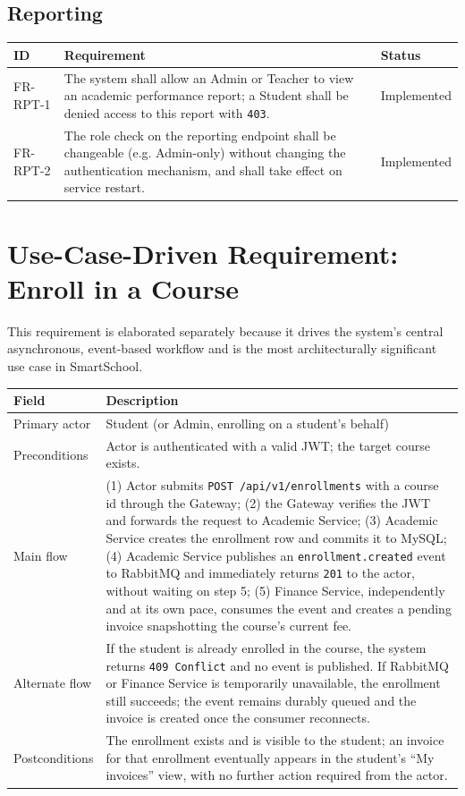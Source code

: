 \documentclass[11pt,a4paper]{report}
\newcommand{\sysname}{SmartSchool}
\begin{document}
\subsection{Reporting}
\begin{longtable}{p{1.9cm} L{10.3cm} p{2.1cm}}
\toprule
\textbf{ID} & \textbf{Requirement} & \textbf{Status} \\
\midrule
\endhead
FR-RPT-1 & The system shall allow an Admin or Teacher to view an academic performance report; a Student shall be denied access to this report with \texttt{403}. & Implemented \\
FR-RPT-2 & The role check on the reporting endpoint shall be changeable (e.g. Admin-only) without changing the authentication mechanism, and shall take effect on service restart. & Implemented \\
\bottomrule
\end{longtable}

\section{Use-Case-Driven Requirement: Enroll in a Course}
This requirement is elaborated separately because it drives the system's
central asynchronous, event-based workflow and is the most architecturally
significant use case in \sysname{}.

\begin{longtable}{L{3.3cm} L{10.7cm}}
\toprule
\textbf{Field} & \textbf{Description} \\
\midrule
\endhead
Primary actor & Student (or Admin, enrolling on a student's behalf) \\
Preconditions & Actor is authenticated with a valid JWT; the target course exists. \\
Main flow & (1) Actor submits \texttt{POST /api/v1/enrollments} with a course id through the Gateway; (2) the Gateway verifies the JWT and forwards the request to Academic Service; (3) Academic Service creates the enrollment row and commits it to MySQL; (4) Academic Service publishes an \texttt{enrollment.created} event to RabbitMQ and immediately returns \texttt{201} to the actor, without waiting on step 5; (5) Finance Service, independently and at its own pace, consumes the event and creates a pending invoice snapshotting the course's current fee. \\
Alternate flow & If the student is already enrolled in the course, the system returns \texttt{409 Conflict} and no event is published. If RabbitMQ or Finance Service is temporarily unavailable, the enrollment still succeeds; the event remains durably queued and the invoice is created once the consumer reconnects. \\
Postconditions & The enrollment exists and is visible to the student; an invoice for that enrollment eventually appears in the student's ``My invoices'' view, with no further action required from the actor. \\
\bottomrule
\end{longtable}
\end{document}
